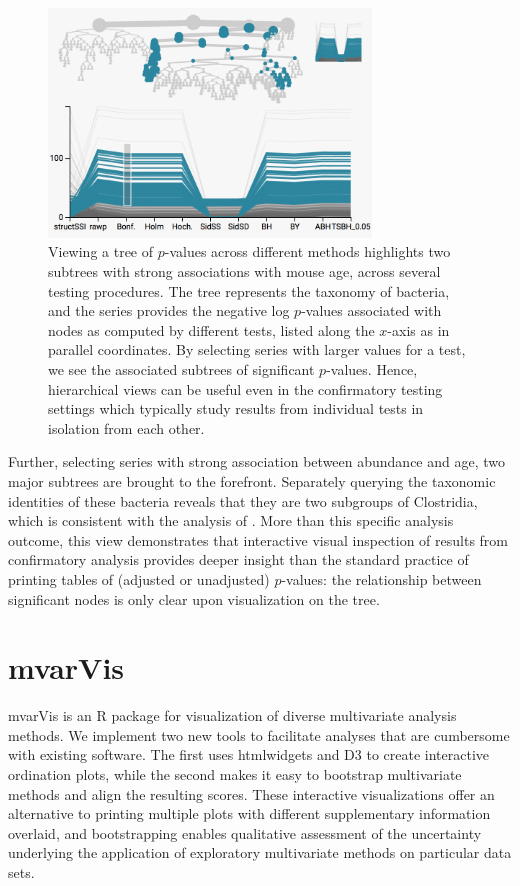 \begin{figure}

{\centering \includegraphics[width=325px]{figure/treelapse/structssi}

}

\caption{Viewing a tree of $p$-values across different methods highlights two
  subtrees with strong associations with mouse age, across several testing
  procedures. The tree represents the taxonomy of bacteria, and the series
  provides the negative log $p$-values associated with nodes as computed by
  different tests, listed along the $x$-axis as in parallel coordinates. By
  selecting series with larger values for a test, we see the associated subtrees
  of significant $p$-values. Hence, hierarchical views can be useful even in the
  confirmatory testing settings which typically study results from individual
  tests in isolation from each other.\label{fig:structssi}}
\end{figure}

Further, selecting series with strong association between abundance and age, two
major subtrees are brought to the forefront. Separately querying the
taxonomic identities of these bacteria reveals that they are two subgroups of
Clostridia, which is consistent with the analysis of
\citep{callahan2016bioconductor}. More than this specific analysis outcome, this
view demonstrates that interactive visual inspection of results from
confirmatory analysis provides deeper insight than the standard practice of
printing tables of (adjusted or unadjusted) $p$-values: the relationship between
significant nodes is only clear upon visualization on the tree.

\section{mvarVis}

mvarVis is an R package for visualization of diverse multivariate analysis
methods. We implement two new tools to facilitate analyses that are cumbersome
with existing software. The first uses htmlwidgets and D3 to create interactive
ordination plots, while the second makes it easy to bootstrap multivariate
methods and align the resulting scores. These interactive visualizations offer an
alternative to printing multiple plots with different supplementary information
overlaid, and bootstrapping enables qualitative assessment of the uncertainty
underlying the application of exploratory multivariate methods on particular
data sets.

